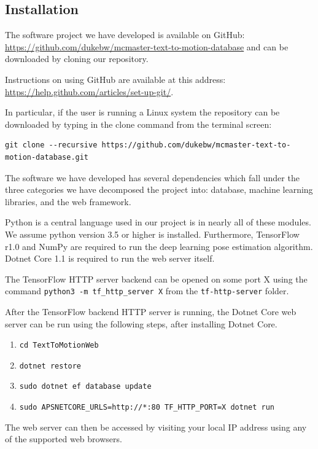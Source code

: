 \documentclass{scrreprt}
\begin{document}
\subsection{Installation}

The software project we have developed is available on GitHub:
\url{https://github.com/dukebw/mcmaster-text-to-motion-database} and can be
downloaded by cloning our repository.

Instructions on using GitHub are available at this address:
\url{https://help.github.com/articles/set-up-git/}.

In particular, if the user is running a Linux system the repository can be
downloaded by typing in the clone command from the terminal screen:

\begin{verbatim}
git clone --recursive https://github.com/dukebw/mcmaster-text-to-motion-database.git
\end{verbatim}

The software we have developed has several dependencies which fall under the
three categories we have decomposed the project into: database, machine
learning libraries, and the web framework.

Python is a central language used in our project is in nearly all of these
modules.  We assume python version 3.5 or higher is installed. Furthermore,
TensorFlow r1.0 and NumPy are required to run the deep learning pose estimation
algorithm.  Dotnet Core 1.1 is required to run the web server itself.

The TensorFlow HTTP server backend can be opened on some port X using the
command \verb|python3 -m tf_http_server X| from the \verb|tf-http-server|
folder.

After the TensorFlow backend HTTP server is running, the Dotnet Core web server
can be run using the following steps, after installing Dotnet Core.

\begin{enumerate}
        \item \verb|cd TextToMotionWeb|
        \item \verb|dotnet restore|
        \item \verb|sudo dotnet ef database update|
        \item \verb|sudo APSNETCORE_URLS=http://*:80 TF_HTTP_PORT=X dotnet run|
\end{enumerate}

The web server can then be accessed by visiting your local IP address using any
of the supported web browsers.
\end{document}
